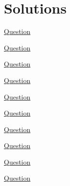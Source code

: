 \documentclass[../probability-notes.tex]{subfiles}
\begin{document}
    \section{Solutions}
    \begin{enumerate}
        \item \hypertarget{a_indcomp}{\hyperlink{q_indcomp}{Question}}
        

        \item \hypertarget{a_conind}{\hyperlink{q_conind}{Question}}
        

        \hypertarget{a_geomeet}{\item} \hyperlink{q_geomeet}{Question} \newline
        

        \hypertarget{a_expfn}{\item} \hyperlink{q_expfn}{Question}
        

        \hypertarget{a_cumuldistfn}{\item} \hyperlink{q_cumuldistfn}{Question} \newline
        

        \hypertarget{a_tossh}{\item} \hyperlink{q_tossh}{Question} \newline
        

        \hypertarget{a_itrexpproof}{\item} \hyperlink{q_itrexpproof}{Question} \newline
        

        \hypertarget{a_itrexpthree}{\item} \hyperlink{q_itrexpthree}{Question} \newline
        

        \hypertarget{a_itrexppractice}{\item} \hyperlink{q_itrexppractice}{Question}\newline
        

        \hypertarget{a_hatproblem}{\item} \hyperlink{q_hatproblem}{Question}\newline
        


\end{enumerate}
\end{document}
